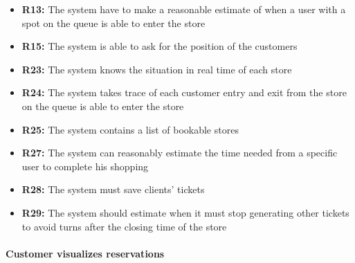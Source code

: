 \documentclass{article}
\begin{document}
\begin{center}
\begin{itemize}
					\item {\bfseries R13: } The system have to make a reasonable estimate of when a user with a spot
on the queue is able to enter the store
					\item {\bfseries R15: } The system is able to ask for the position of the customers
					\item {\bfseries R23: } The system knows the situation in real time of each store

					\item {\bfseries R24: } The system takes trace of each customer entry and exit from the store
on the queue is able to enter the store
					\item {\bfseries R25: } The system contains a list of bookable stores
					\item {\bfseries R27: } The system can reasonably estimate the time needed from a specific user
to complete his shopping

					\item {\bfseries R28: } The system must save clients’ tickets
					\item {\bfseries R29: } The system should estimate when it must stop generating other tickets to
avoid turns after the closing time of the store

					\end{itemize}
				\end{center}
			
			\paragraph{Customer visualizes reservations}
			
\end{document}
